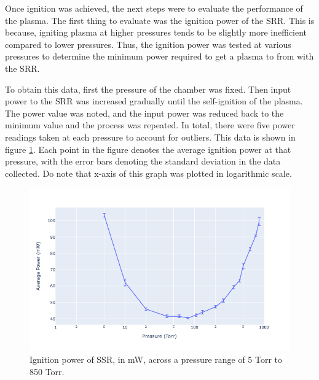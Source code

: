 Once ignition was achieved, the next steps were to evaluate the performance of the plasma. The first thing to evaluate was the ignition power of the SRR. This is because, igniting plasma at higher pressures tends to be slightly more inefficient compared to lower pressures. Thus, the ignition power was tested at various pressures to determine the minimum power required to get a plasma to from with the SRR. 

To obtain this data, first the pressure of the chamber was fixed. Then input power to the SRR was increased gradually until the self-ignition of the plasma. The power value was noted, and the input power was reduced back to the minimum value and the process was repeated. In total, there were five power readings taken at each pressure to account for outliers. This data is shown in figure \ref{fig:ignition_power}. Each point in the figure denotes the average ignition power at that pressure, with the error bars denoting the standard deviation in the data collected. Do note that x-axis of this graph was plotted in logarithmic scale. 

\begin{figure}[h!]
	\centering
	\includegraphics[width=\linewidth]{chapter_4/figures/ignition_power.png}
	\caption{Ignition power of SSR, in mW, across a pressure range of 5 Torr to 850 Torr.}
	\label{fig:ignition_power}
\end{figure}

